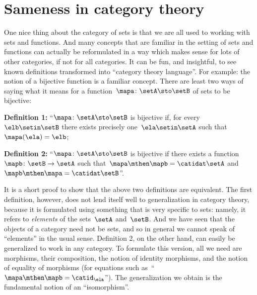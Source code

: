 
\section{Sameness in category theory}
\label{sec:attributes_sameness}

One nice thing about the category of sets is that we are all used to working with sets and functions.
And many concepts that are familiar in the setting of sets and functions can actually be reformulated in a way which makes sense for lots of other categories, if not for all categories.
It can be fun, and insightful, to see known definitions transformed into ``category theory language''.
For example: the notion of a bijective function is a familiar concept.
There are least two ways of saying what it means for a function~$\mapa \colon \setA \sto \setB$ of sets to be bijective:

\textbf{Definition 1:} ``$\mapa \colon \setA \sto \setB$ is bijective if, for every~$\elb \setin \setB$ there exists precisely one~$\ela \setin \setA$ such that~$\mapa(\ela) = \elb$;

\textbf{Definition 2:} ``$\mapa \colon \setA \sto \setB$ is bijective if there exists a function~$\mapb\colon \setB \to \setA$ such that~$\mapa \mthen \mapb = \catidat\setA$ and~$\mapb \mthen \mapa = \catidat\setB$''.

It is a short proof to show that the above two definitions are equivalent.
The first definition, however, does not lend itself well to generalization in category theory, because it is formulated using something that is very specific to sets: namely, it refers to \emph{elements} of the sets~$\setA$ and~$\setB$.
And we have seen that the objects of a category need not be sets, and so in general we cannot speak of ``elements'' in the usual sense.
Definition 2, on the other hand, can easily be generalized to work in any category.
To formulate this version, all we need are morphisms, their composition, the notion of identity morphisms, and the notion of equality of morphisms (for equations such as~``$\mapa \mthen \mapb= \catid_\ela$'').
The generalization we obtain is the fundamental notion of an ``isomorphism''.



